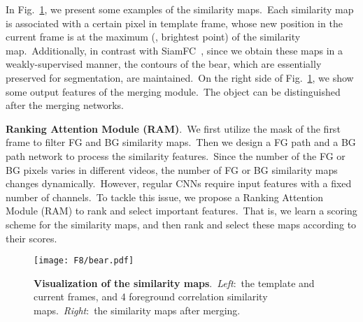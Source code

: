 \documentclass[10pt,twocolumn,letterpaper]{article}
\begin{document}
In Fig.~\ref{fig:visual}, we present some examples of the similarity maps.\ Each similarity map is associated with a certain pixel in template frame, whose new position in the current frame is at the maximum (\ie, brightest point) of the similarity map.\ Additionally, in contrast with SiamFC~\cite{siamfc}, since we obtain these maps in a weakly-supervised manner, the contours of the bear, which are essentially preserved for segmentation, are maintained.\ On the right side of Fig.~\ref{fig:visual}, we show some output features of the merging module.\ The object can be distinguished after the merging networks.







\noindent
\textbf{Ranking Attention Module (RAM)}.\
We first utilize the mask of the first frame to filter FG and BG similarity maps.\ Then we design a FG path and a BG path network to process the similarity features.\ Since the number of the FG or BG pixels varies in different videos, the number of FG or BG similarity maps changes dynamically.\ However, regular CNNs require input features with a fixed number of channels.\ 
To tackle this issue, we propose a Ranking Attention Module (RAM) to rank and select important features.\ That is, we learn a scoring scheme for the similarity maps, and then rank and select these maps according to their scores.\ 





\begin{figure}
\begin{center}
\vspace{-5mm}
\texttt{[image: F8/bear.pdf]}
\end{center}
\vspace{-6mm}
\caption{\textbf{Visualization of the similarity maps}.\ \textsl{Left}:\ the template and current frames, and 4 foreground correlation similarity maps.\ \textsl{Right}:\ the similarity maps after merging.}
\vspace{-5mm}
\label{fig:visual}
\end{figure}
\end{document}
